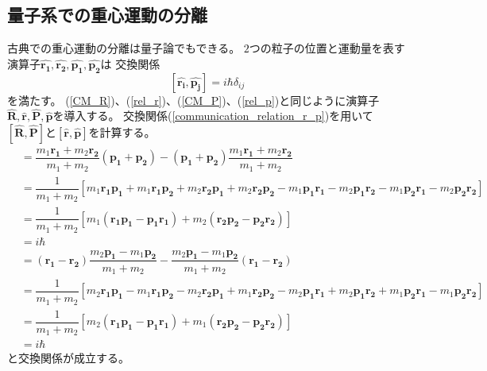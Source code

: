 \documentclass[dvipdfmx,a4paper,16pt]{jsarticle}
\begin{document}
\subsection{量子系での重心運動の分離}\label{CM_separation}
古典での重心運動の分離は量子論でもできる。
$2$つの粒子の位置と運動量を表す演算子$\hat{\bm{r_1}},\hat{\bm{r_2}},\hat{\bm{p_1}},\hat{\bm{p_2}}$は
交換関係
\begin{equation}
	\label{communication_relation_r_p}
	[\hat{\bm{r_i}},\hat{\bm{p_j}}] = i\hbar\delta_{ij}
\end{equation}
を満たす。
(\ref{CM_R})、(\ref{rel_r})、(\ref{CM_P})、(\ref{rel_p})と同じように演算子$\hat{\bm{R}},\hat{\bm{r}},\hat{\bm{P}},\hat{\bm{p}}$を導入する。
交換関係(\ref{communication_relation_r_p})を用いて$[\hat{\bm{R}},\hat{\bm{P}}]$と$[\hat{\bm{r}},\hat{\bm{p}}]$を計算する。
\begin{align}
	[\hat{\bm{R}},\hat{\bm{P}}]
	&= \dfrac{m_1\bm{r_1} + m_2\bm{r_2}}{m_1 + m_2}(\bm{p_1} + \bm{p_2}) - (\bm{p_1} + \bm{p_2})\dfrac{m_1\bm{r_1} + m_2\bm{r_2}}{m_1 + m_2}\\
	&= \dfrac{1}{m_1 + m_2}[m_1\bm{r_1}\bm{p_1} + m_1\bm{r_1}\bm{p_2} + m_2\bm{r_2}\bm{p_1} + m_2\bm{r_2}\bm{p_2}
	- m_1\bm{p_1}\bm{r_1} - m_2\bm{p_1}\bm{r_2} - m_1\bm{p_2}\bm{r_1} - m_2\bm{p_2}\bm{r_2}] \\
	&= \dfrac{1}{m_1 + m_2}[ m_1(\bm{r_1}\bm{p_1} - \bm{p_1}\bm{r_1}) + m_2(\bm{r_2}\bm{p_2} - \bm{p_2}\bm{r_2})] \\
	&= i\hbar
\end{align}
\begin{align}
	[\hat{\bm{r}},\hat{\bm{p}}]
	&= (\bm{r_1} - \bm{r_2})\dfrac{m_2\bm{p_1} - m_1\bm{p_2}}{m_1 + m_2} - \dfrac{m_2\bm{p_1} - m_1\bm{p_2}}{m_1 + m_2}(\bm{r_1} - \bm{r_2}) \\
	&= \dfrac{1}{m_1 + m_2}[m_2\bm{r_1}\bm{p_1} - m_1\bm{r_1}\bm{p_2} - m_2\bm{r_2}\bm{p_1} + m_1\bm{r_2}\bm{p_2}
	- m_2\bm{p_1}\bm{r_1} + m_2\bm{p_1}\bm{r_2} + m_1\bm{p_2}\bm{r_1} - m_1\bm{p_2}\bm{r_2}] \\
	&= \dfrac{1}{m_1 + m_2}[m_2(\bm{r_1}\bm{p_1} - \bm{p_1}\bm{r_1}) + m_1(\bm{r_2}\bm{p_2} - \bm{p_2}\bm{r_2})] \\
	&= i\hbar
\end{align}
と交換関係が成立する。
\end{document}
